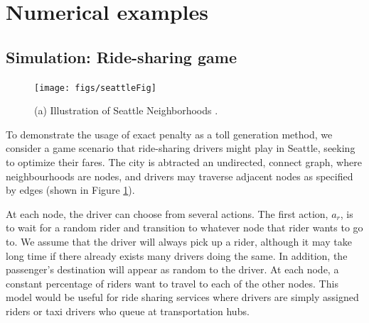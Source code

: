 \section{Numerical examples}\label{numerical examples}

\subsection{Simulation: Ride-sharing game}
\label{sec:rideshare}


\begin{figure}
\centering
\texttt{[image: figs/seattleFig]}
\caption{(a) Illustration of Seattle Neighborhoods .}
\label{fig:nbhds}
\end{figure}


To demonstrate the usage of exact penalty as a toll generation method, we consider a game scenario that ride-sharing drivers might play in Seattle, seeking to optimize their fares. The city is abtracted an undirected, connect graph, where neighbourhoods are nodes, and drivers may traverse adjacent nodes as specified by edges (shown in Figure \ref{fig:nbhds}). %

At each node, the driver can choose from several actions. The first action, $a_r$, is to wait for a random rider and transition to whatever node that rider wants to go to. We assume that the driver will always pick up a rider, although it may take long time if there already exists many drivers doing the same. In addition, the passenger's destination will appear as random to the driver.  At each node, a constant percentage of riders want to travel to each of the other nodes.  
This model would be useful for ride sharing services where drivers are simply assigned riders or taxi drivers who queue at transportation hubs.  

